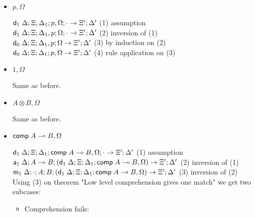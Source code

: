 \documentclass[9pt]{article}
\begin{document}
\begin{itemize}
\item $p, \Omega$

$\mathsf{d}_1 \; \Delta; \Xi; \Delta_1; p, \Omega; \cdot \rightarrow \Xi'; \Delta'$ \hfill (1) assumption \\
$\mathsf{d}_1 \; \Delta; \Xi; \Delta_1, p; \Omega; \cdot \rightarrow \Xi'; \Delta'$ \hfill (2) inversion of (1) \\
$\mathsf{d}_0 \; \Delta; \Xi; \Delta_1, p; \Omega \rightarrow \Xi'; \Delta'$ \hfill (3) by induction on (2) \\
$\mathsf{d}_0 \; \Delta; \Xi; \Delta_1; p, \Omega \rightarrow \Xi'; \Delta'$ \hfill (4) rule application on (3) \\

\item $1, \Omega$

Same as before.

\item $A \otimes B, \Omega$

Same as before.

\item $\mathsf{comp} \; A \multimap B, \Omega$

$\mathsf{d}_1 \; \Delta; \Xi; \Delta_1; \mathsf{comp} \; A \multimap B, \Omega; \cdot \rightarrow \Xi'; \Delta'$ \hfill (1) assumption \\
$\mathsf{a}_1 \; \Delta; A \multimap B; (\mathsf{d}_1 \; \Delta; \Xi; \Delta_1; \mathsf{comp} \; A \multimap B, \Omega) \rightarrow \Xi'; \Delta'$ \hfill (2) inversion of (1) \\
$\mathsf{m}_1 \; \Delta; \cdot; A; B ; (\mathsf{d}_1 \; \Delta; \Xi; \Delta_1; \mathsf{comp} \; A \multimap B, \Omega) \rightarrow \Xi'; \Delta'$ \hfill (3) inversion of (2) \\
Using (3) on theorem "Low level comprehension gives one match" we get two subcases:

\begin{itemize}
\item Comprehension fails:


\end{itemize}
\end{itemize}
\end{document}
